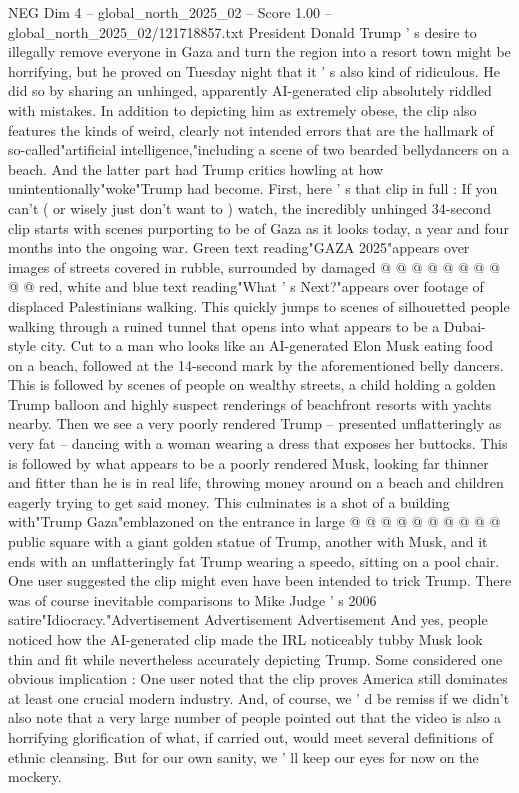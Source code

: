 \begin{textsample}{NEG Dim 4 – global\_north\_2025\_02 – Score 1.00 – global\_north\_2025\_02/121718857.txt}  \label{ex:f4_neg_403}
President Donald Trump ' s desire to illegally remove everyone in Gaza and turn the region into a resort town might be horrifying, but he proved on Tuesday night that it ' s also kind of ridiculous.
He did so by sharing an unhinged, apparently AI-generated clip absolutely riddled with mistakes.
In addition to depicting him as extremely obese, the clip also features the kinds of weird, clearly not intended errors that are the hallmark of so-called"artificial intelligence,"including a scene of two bearded bellydancers on a beach.
And the latter part had Trump critics howling at how unintentionally"woke"Trump had become.
First, here ' s that clip in full : If you can't ( or wisely just don't want to ) watch, the incredibly unhinged 34-second clip starts with scenes purporting to be of Gaza as it looks today, a year and four months into the ongoing war.
Green text reading"GAZA 2025"appears over images of streets covered in rubble, surrounded by damaged @ @ @ @ @ @ @ @ @ @ red, white and blue text reading"What ' s Next?"appears over footage of displaced Palestinians walking.
This quickly jumps to scenes of silhouetted people walking through a ruined tunnel that opens into what appears to be a Dubai-style city.
Cut to a man who looks like an AI-generated Elon Musk eating food on a beach, followed at the 14-second mark by the aforementioned belly dancers.
This is followed by scenes of people on wealthy streets, a child holding a golden Trump balloon and highly suspect renderings of beachfront resorts with yachts nearby.
Then we see a very poorly rendered Trump -- presented unflatteringly as very fat -- dancing with a woman wearing a dress that exposes her buttocks.
This is followed by what appears to be a poorly rendered Musk, looking far thinner and fitter than he is in real life, throwing money around on a beach and children eagerly trying to get said money.
This culminates is a shot of a building with"Trump Gaza"emblazoned on the entrance in large @ @ @ @ @ @ @ @ @ @ public square with a giant golden statue of Trump, another with Musk, and it ends with an unflatteringly fat Trump wearing a speedo, sitting on a pool chair.
One user suggested the clip might even have been intended to trick Trump.
There was of course inevitable comparisons to Mike Judge ' s 2006 satire"Idiocracy."Advertisement Advertisement Advertisement And yes, people noticed how the AI-generated clip made the IRL noticeably tubby Musk look thin and fit while nevertheless accurately depicting Trump.
Some considered one obvious implication : One user noted that the clip proves America still dominates at least one crucial modern industry.
And, of course, we ' d be remiss if we didn't also note that a very large number of people pointed out that the video is also a horrifying glorification of what, if carried out, would meet several definitions of ethnic cleansing.
But for our own sanity, we ' ll keep our eyes for now on the mockery.

\end{textsample}
